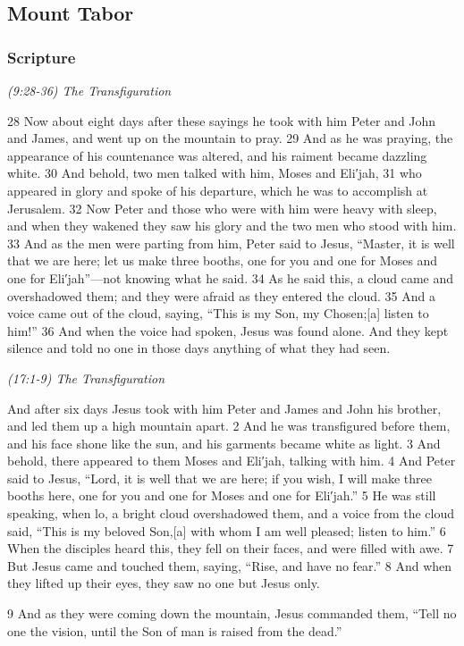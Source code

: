 \documentclass[letterpaper]{report}
\begin{document}
\clearpage
\subsection{Mount Tabor}
\begin{multicols}{2}
	\mbox{}
\end{multicols}
\subsubsection{Scripture}

{\centering
	\emph{(9:28-36) The Transfiguration}\\
}
\begin{multicols}{2}
28 Now about eight days after these sayings he took with him Peter and John and James, and went up on the mountain to pray. 29 And as he was praying, the appearance of his countenance was altered, and his raiment became dazzling white. 30 And behold, two men talked with him, Moses and Eli′jah, 31 who appeared in glory and spoke of his departure, which he was to accomplish at Jerusalem. 32 Now Peter and those who were with him were heavy with sleep, and when they wakened they saw his glory and the two men who stood with him. 33 And as the men were parting from him, Peter said to Jesus, “Master, it is well that we are here; let us make three booths, one for you and one for Moses and one for Eli′jah”—not knowing what he said. 34 As he said this, a cloud came and overshadowed them; and they were afraid as they entered the cloud. 35 And a voice came out of the cloud, saying, “This is my Son, my Chosen;[a] listen to him!” 36 And when the voice had spoken, Jesus was found alone. And they kept silence and told no one in those days anything of what they had seen.
\end{multicols}

{\centering
	\emph{(17:1-9) The Transfiguration}\\
}
\begin{multicols}{2}
And after six days Jesus took with him Peter and James and John his brother, and led them up a high mountain apart. 2 And he was transfigured before them, and his face shone like the sun, and his garments became white as light. 3 And behold, there appeared to them Moses and Eli′jah, talking with him. 4 And Peter said to Jesus, “Lord, it is well that we are here; if you wish, I will make three booths here, one for you and one for Moses and one for Eli′jah.” 5 He was still speaking, when lo, a bright cloud overshadowed them, and a voice from the cloud said, “This is my beloved Son,[a] with whom I am well pleased; listen to him.” 6 When the disciples heard this, they fell on their faces, and were filled with awe. 7 But Jesus came and touched them, saying, “Rise, and have no fear.” 8 And when they lifted up their eyes, they saw no one but Jesus only.

9 And as they were coming down the mountain, Jesus commanded them, “Tell no one the vision, until the Son of man is raised from the dead.”
\end{multicols}
\end{document}
